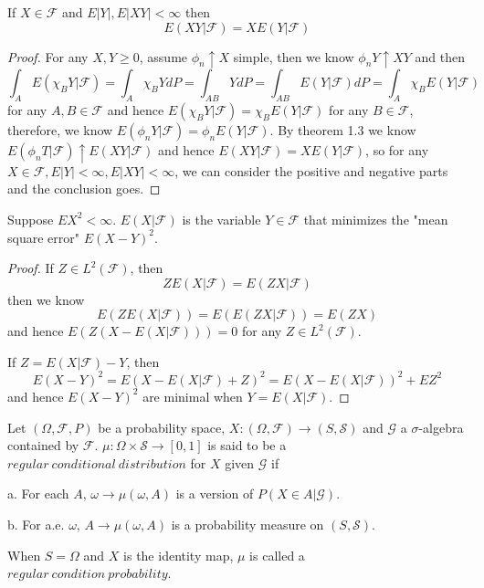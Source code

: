 \documentclass[lang=en, color=blue, ]{elegantbook}
\newcommand{\F}{\mathcal{F}}
\begin{document}
\begin{theorem}
    If $X\in\F$ and $E|Y|, E|XY| < \infty$ then
    \[E(XY|\F) = XE(Y|\F)\]
\end{theorem}
\begin{proof}\par
    For any $X,Y\geq 0$, assume $\phi_n \uparrow X$ simple, then we know $\phi_nY \uparrow XY$ and then
    \[\int_A E(\chi_BY|\F) = \int_A \chi_BY dP = \int_{AB} YdP = \int_{AB} E(Y|\F)dP = \int_A \chi_BE(Y|\F)\]
    for any $A,B\in\F$ and hence $E(\chi_BY|\F) = \chi_BE(Y|\F)$ for any $B\in\F$, therefore, we know $E(\phi_nY|\F) = \phi_nE(Y|\F)$. By theorem 1.3 we know $E(\phi_nT|\F)\uparrow E(XY|\F)$ and hence $E(XY|\F) = XE(Y|\F)$, so for any $X\in\F, E|Y|<\infty, E|XY|<\infty$, we can consider the positive and negative parts and the conclusion goes.
\end{proof}

\begin{theorem}
    Suppose $EX^2 < \infty$. $E(X|\F)$ is the variable $Y\in\F$ that minimizes the "mean square error" $E(X-Y)^2$.
\end{theorem}
\begin{proof}\par
    If $Z\in L^2(\F)$, then
    \[ZE(X|\F) = E(ZX|\F)\]
    then we know
    \[E(ZE(X|\F)) = E(E(ZX|\F)) = E(ZX)\]
    and hence $E(Z(X-E(X|\F))) = 0$ for any $Z\in L^2(\F)$.\par
    If $Z = E(X|\F)-Y$, then
    \[E(X-Y)^2 = E(X-E(X|\F)+Z)^2 = E(X-E(X|\F))^2 + EZ^2\]
    and hence $E(X-Y)^2$ are minimal when $Y = E(X|\F)$.\par
\end{proof}

\begin{definition}
Let $(\Omega, \F, P)$ be a probability space, $X:(\Omega,\F)\to (S,\mathcal{S})$ and $\mathcal{G}$ a $\sigma$-algebra contained by $\F$. $\mu: \Omega\times \mathcal{S} \to [0,1]$ is said to be a $regular\ conditional\ distribution$ for $X$ given $\mathcal{G}$ if\par
a. For each $A$, $\omega \to \mu(\omega, A)$ is a version of $P(X\in A|\mathcal{G})$.\par
b. For a.e. $\omega$, $A\to \mu(\omega, A)$ is a probability measure on $(S,\mathcal{S})$.\par
When $S=\Omega$ and $X$ is the identity map, $\mu$ is called a $regular\ condition\ probability$.
\end{definition}
\end{document}
